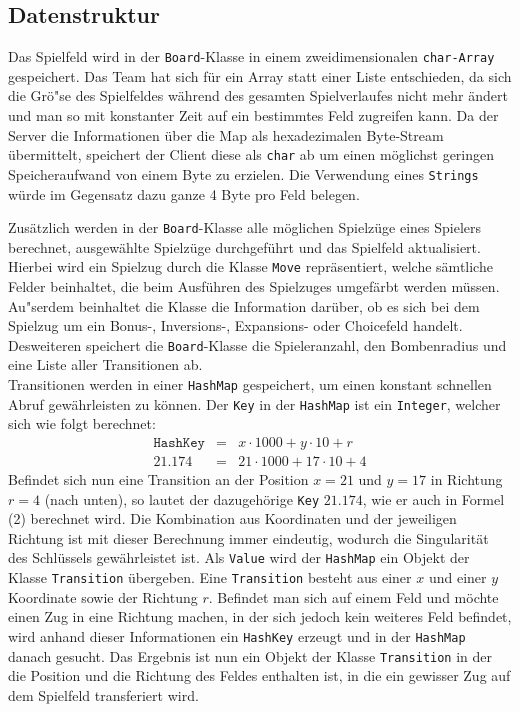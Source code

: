\newpage

\subsection{Datenstruktur}\label{subsec:datenstruktur}
Das Spielfeld wird in der \texttt{Board}-Klasse in einem zweidimensionalen \texttt{char-Array} gespeichert.
Das Team hat sich f\"ur ein Array statt einer Liste entschieden, da sich die Gr\"o"se des Spielfeldes w\"ahrend des gesamten Spielverlaufes nicht mehr \"andert und man so mit konstanter Zeit auf ein bestimmtes Feld zugreifen kann.
Da der Server die Informationen \"uber die Map als hexadezimalen Byte-Stream \"ubermittelt, speichert der Client diese als \texttt{char} ab um einen m\"oglichst geringen Speicheraufwand von einem Byte zu erzielen.
Die Verwendung eines \texttt{Strings} w\"urde im Gegensatz dazu ganze 4 Byte pro Feld belegen.

Zus\"atzlich werden in der \texttt{Board}-Klasse alle m\"oglichen Spielz\"uge eines Spielers berechnet, ausgew\"ahlte Spielz\"uge durchgef\"uhrt und das Spielfeld aktualisiert.
Hierbei wird ein Spielzug durch die Klasse \texttt{Move} repr\"asentiert, welche s\"amtliche Felder beinhaltet, die beim Ausf\"uhren des Spielzuges umgef\"arbt werden m\"ussen.
Au"serdem beinhaltet die Klasse die Information dar\"uber, ob es sich bei dem Spielzug um ein Bonus-, Inversions-, Expansions- oder Choicefeld handelt.
Desweiteren speichert die \texttt{Board}-Klasse die Spieleranzahl, den Bombenradius und eine Liste aller Transitionen ab. \\
Transitionen werden in einer \texttt{HashMap} gespeichert, um einen konstant schnellen Abruf gew\"ahr\-leisten zu k\"onnen.
Der \texttt{Key} in der \texttt{HashMap} ist ein \texttt{Integer}, welcher sich wie folgt berechnet:
\begin{align}
    \texttt{HashKey} &=& x \cdot 1000 + y \cdot 10 + r \\
    21.174 &=& 21 \cdot 1000 + 17 \cdot 10 + 4
\end{align}
Befindet sich nun eine Transition an der Position $x=21$ und $y=17$ in Richtung $r=4$ (nach unten), so lautet der dazugeh\"orige \texttt{Key} $21.174$, wie er auch in Formel (2) berechnet wird.
Die Kombination aus Koordinaten und der jeweiligen Richtung ist mit dieser Berechnung immer eindeutig, wodurch die Singularit\"at des Schl\"ussels gew\"ahrleistet ist.
Als \texttt{Value} wird der \texttt{HashMap} ein Objekt der Klasse \texttt{Transition} \"ubergeben.
Eine \texttt{Transition} besteht aus einer $x$ und einer $y$ Koordinate sowie der Richtung $r$.
Befindet man sich auf einem Feld und m\"ochte einen Zug in eine Richtung machen, in der sich jedoch kein weiteres Feld befindet, wird anhand dieser Informationen ein \texttt{HashKey} erzeugt und in der \texttt{HashMap} danach gesucht.
Das Ergebnis ist nun ein Objekt der Klasse \texttt{Transition} in der die Position und die Richtung des Feldes enthalten ist, in die ein gewisser Zug auf dem Spielfeld transferiert wird.

